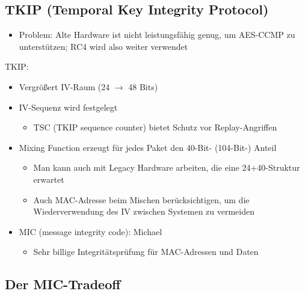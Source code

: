 \documentclass[openany]{book}
\begin{document}
\subsection{TKIP (Temporal Key Integrity Protocol)}

\begin{itemize}
    \item Problem: Alte Hardware ist nicht leistungsfähig genug, um AES-CCMP zu unterstützen; RC4 wird also weiter verwendet
\end{itemize}

TKIP:

\begin{itemize}
    \item Vergrößert IV-Raum (24 $\rightarrow$ 48 Bits)
    \item IV-Sequenz wird festgelegt
    \begin{itemize}
        \item TSC (TKIP sequence counter) bietet Schutz vor Replay-Angriffen
    \end{itemize}
    \item Mixing Function erzeugt für jedes Paket den 40-Bit- (104-Bit-) Anteil
    \begin{itemize}
        \item Man kann auch mit Legacy Hardware arbeiten, die eine 24+40-Struktur erwartet
        \item Auch MAC-Adresse beim Mischen berücksichtigen, um die Wiederverwendung des IV zwischen Systemen zu vermeiden
    \end{itemize}
    \item MIC (message integrity code): Michael
    \begin{itemize}
        \item Sehr billige Integritätsprüfung für MAC-Adressen und Daten
    \end{itemize}
\end{itemize}

\subsection{Der MIC-Tradeoff}
\end{document}
